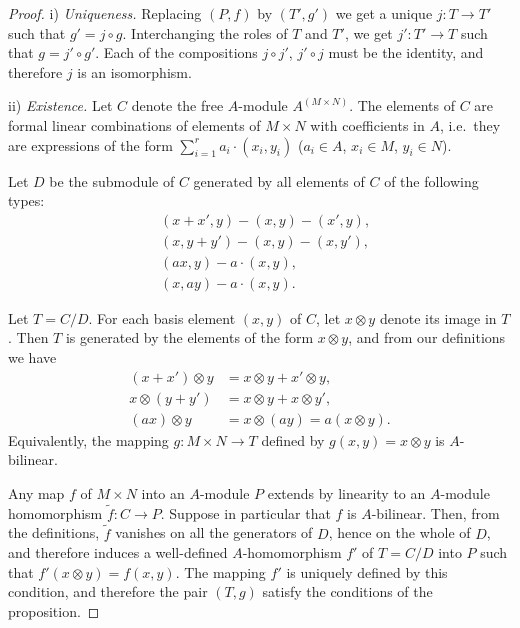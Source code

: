 \begin{proof}
i) \textit{Uniqueness.} Replacing $(P, f)$ by $(T', g')$ we get a unique $j \colon T \to T'$ such that $g' = j \circ g$. Interchanging the roles of $T$ and $T'$, we get $j' \colon T' \to T$ such that $g = j' \circ g'$. Each of the compositions $j \circ j'$, $j' \circ j$ must be the identity, and therefore $j$ is an isomorphism.

ii) \textit{Existence.} Let $C$ denote the free $A$-module $A^{(M \times N)}$. The elements of $C$ are formal linear combinations of elements of $M \times N$ with coefficients in $A$, i.e.\ they are expressions of the form $\sum_{i=1}^r a_i \cdot (x_i, y_i)$ ($a_i \in A$, $x_i \in M$, $y_i \in N$).

Let $D$ be the submodule of $C$ generated by all elements of $C$ of the following types:
\begin{align*}
    &(x + x', y) - (x, y) - (x', y), \\
    &(x, y + y') - (x, y) - (x, y'), \\
    &(ax, y) - a \cdot (x, y), \\
    &(x, ay) - a \cdot (x, y).
\end{align*}

Let $T = C/D$. For each basis element $(x, y)$ of $C$, let $x \otimes y$ denote its image in $T$. Then $T$ is generated by the elements of the form $x \otimes y$, and from our definitions we have
\begin{align*}
    (x + x') \otimes y &= x \otimes y + x' \otimes y, \\
    x \otimes (y + y') &= x \otimes y + x \otimes y', \\
    (ax) \otimes y &= x \otimes (ay) = a(x \otimes y).
\end{align*}
Equivalently, the mapping $g \colon M \times N \to T$ defined by $g(x, y) = x \otimes y$ is $A$-bilinear.

Any map $f$ of $M \times N$ into an $A$-module $P$ extends by linearity to an $A$-module homomorphism $\tilde{f} \colon C \to P$. Suppose in particular that $f$ is $A$-bilinear. Then, from the definitions, $\tilde{f}$ vanishes on all the generators of $D$, hence on the whole of $D$, and therefore induces a well-defined $A$-homomorphism $f'$ of $T = C/D$ into $P$ such that $f'(x \otimes y) = f(x, y)$. The mapping $f'$ is uniquely defined by this condition, and therefore the pair $(T, g)$ satisfy the conditions of the proposition.
\end{proof}

